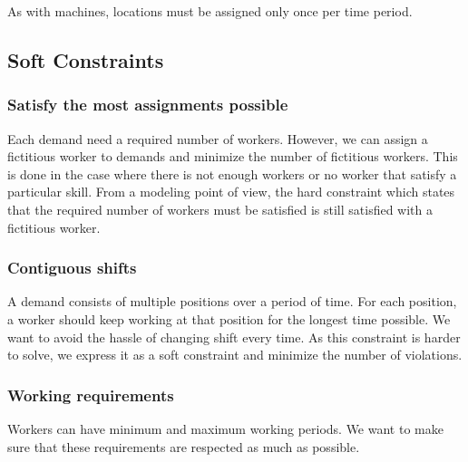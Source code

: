 \documentclass[../thesis.tex]{subfiles}
\begin{document}
As with machines, locations must be assigned only once per time period.


\subsection{Soft Constraints}

\subsubsection{Satisfy the most assignments possible}

Each demand need a required number of workers. However, we can assign a fictitious worker to demands 
and minimize the number of fictitious workers. This is done in the case where there is not enough workers
or no worker that satisfy a particular skill. From a modeling point of view, the hard constraint which states
that the required number of workers must be satisfied is still satisfied with a fictitious worker.

\subsubsection{Contiguous shifts}

A demand consists of multiple positions over a period of time. 
For each position, a worker should keep working at that position for the longest time possible. 
We want to avoid the hassle of changing shift every time. 
As this constraint is harder to solve, we express it as a soft constraint and minimize the number of 
violations.

\subsubsection{Working requirements}

Workers can have minimum and maximum working periods. We want to make sure 
that these requirements are respected as much as possible.
\end{document}

